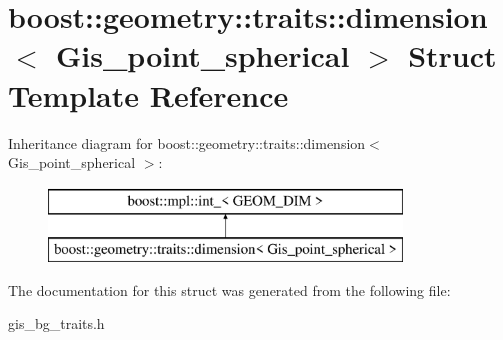 \hypertarget{structboost_1_1geometry_1_1traits_1_1dimension_3_01Gis__point__spherical_01_4}{}\section{boost\+:\+:geometry\+:\+:traits\+:\+:dimension$<$ Gis\+\_\+point\+\_\+spherical $>$ Struct Template Reference}
\label{structboost_1_1geometry_1_1traits_1_1dimension_3_01Gis__point__spherical_01_4}
Inheritance diagram for boost\+:\+:geometry\+:\+:traits\+:\+:dimension$<$ Gis\+\_\+point\+\_\+spherical $>$\+:\begin{figure}[H]
\begin{center}
\leavevmode
\includegraphics[height=2.000000cm]{structboost_1_1geometry_1_1traits_1_1dimension_3_01Gis__point__spherical_01_4}
\end{center}
\end{figure}


The documentation for this struct was generated from the following file\+:\begin{DoxyCompactItemize}
\item 
gis\+\_\+bg\+\_\+traits.\+h\end{DoxyCompactItemize}
